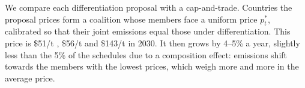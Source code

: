 \documentclass[12pt,english]{article}
\theoremstyle{remark}
\begin{document}
We compare each differentiation proposal with a cap-and-trade. Countries the proposal prices form a coalition whose members face a uniform price $p^*_t$, calibrated so that their joint emissions equal those under differentiation. %
This price is \$51/t \citep{wolfram_building_2025}, \$56/t \citep{banerjee_grand_2025} and \$143/t \citep{equal_right_climate_2023} in 2030. It then grows by 4--5\% a year, slightly less than the 5\% of the schedules due to a composition effect: emissions shift towards the members with the lowest prices, which weigh more and more in the average price. %
\end{document}
